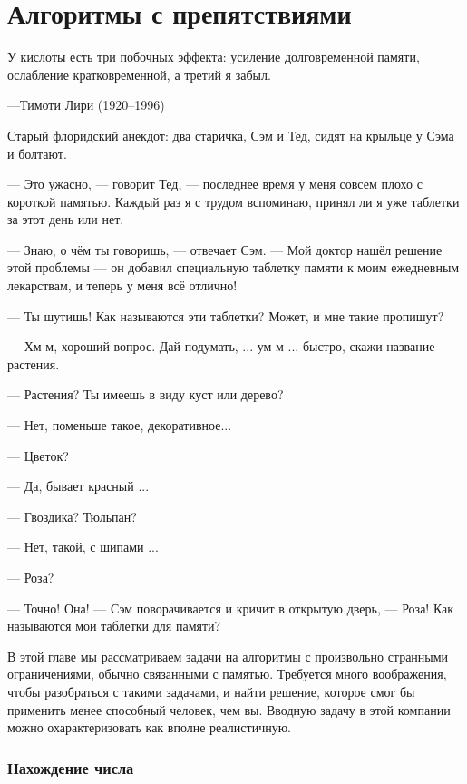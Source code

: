 \chapter*{Алгоритмы с препятствиями}

\setlength{\epigraphwidth}{.85\textwidth}
\epigraph{У кислоты есть три побочных эффекта: усиление долговременной памяти, ослабление кратковременной, а третий я забыл.}{---Тимоти Лири (1920--1996)}

Старый флоридский анекдот:
два старичка, Сэм и Тед, сидят на крыльце у Сэма и болтают.

--- Это ужасно, --- говорит Тед, --- последнее время у меня совсем плохо с короткой памятью.
Каждый раз я с трудом вспоминаю, принял ли я уже таблетки за этот день или нет.

--- Знаю, о чём ты говоришь, --- отвечает Сэм.
--- Мой доктор нашёл решение этой проблемы --- он добавил специальную таблетку памяти к моим ежедневным лекарствам, и теперь у меня всё отлично!

--- Ты шутишь! Как называются эти таблетки? Может, и мне такие пропишут?

--- Хм-м, хороший вопрос.
Дай подумать, ... ум-м ... быстро, скажи название растения.

--- Растения? Ты имеешь в виду куст или дерево?

--- Нет, поменьше такое, декоративное...

--- Цветок?

--- Да, бывает красный ...

--- Гвоздика? Тюльпан?

--- Нет, такой, с шипами ...

--- Роза?

--- Точно! Она! --- Сэм поворачивается и кричит в открытую дверь, --- Роза! Как называются мои таблетки для памяти?

\medskip

В этой главе мы рассматриваем задачи на алгоритмы с произвольно странными ограничениями, обычно связанными с памятью.
Требуется много воображения, чтобы разобраться с такими задачами, и найти решение, которое смог бы применить менее способный человек, чем вы.
Вводную задачу в этой компании можно охарактеризовать как вполне реалистичную.

\subsection*{Нахождение числа}%

